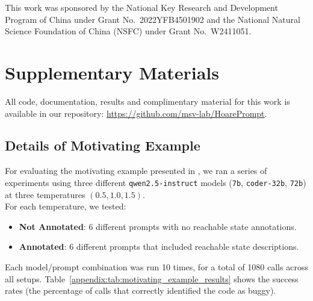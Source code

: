 \documentclass[sigconf]{acmart}
\newcommand{\projName}{HoarePrompt\xspace}
\begin{document}
\begin{acks}
This work was sponsored by the National Key Research and Development Program of China under Grant No.\ 2022YFB4501902 and the National Natural Science Foundation of China (NSFC) under Grant No.\ W2411051.

\end{acks}




\onecolumn
\pagebreak
\twocolumn
\appendix

\section{Supplementary Materials}

All code, documentation, results and complimentary material for this work is available in our repository: \url{https://github.com/msv-lab/HoarePrompt}.

\subsection{Details of Motivating Example}
\label{appendix:motivating_example}

For evaluating the motivating example presented in , we ran a series of experiments using three different \texttt{qwen2.5-instruct} models (\texttt{7b}, \texttt{coder-32b}, \texttt{72b})  at three temperatures \((0.5, 1.0, 1.5)\).\\ For each temperature, we tested:
\begin{itemize}
    \item \textbf{Not Annotated}: 6 different prompts with no reachable state annotations.
    \item \textbf{Annotated}: 6 different prompts that included reachable state descriptions.
\end{itemize}
Each model/prompt combination was run 10 times, for a total of 1080 calls across all setups. Table~\ref{appendix:tab:motivating_example_results} shows the success rates (the percentage of calls that correctly identified the code as buggy).
\end{document}
